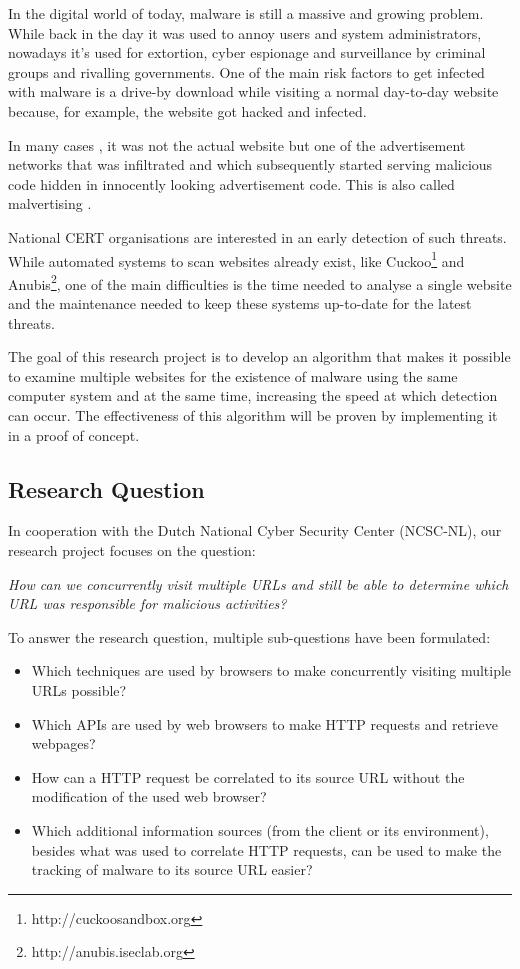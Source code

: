 In the digital world of today, malware is still a massive and growing problem. While back in the day it was used to annoy users and system administrators, nowadays it's used for extortion, cyber espionage and surveillance by criminal groups and rivalling governments. One of the main risk factors to get infected with malware is a drive-by download while visiting a normal day-to-day website because, for example, the website got hacked and infected. 

In many cases \cite{proofpoint,foxittelegraaf,foxityahoo}, it was not the actual website but one of the advertisement networks that was infiltrated and which subsequently started serving malicious code hidden in innocently looking advertisement code. This is also called malvertising \cite{Li2012}.

National CERT organisations are interested in an early detection of such threats. While automated systems to scan websites already exist, like Cuckoo\footnote{http://cuckoosandbox.org} and Anubis\footnote{http://anubis.iseclab.org}, one of the main difficulties is the time needed to analyse a single website and the maintenance needed to keep these systems up-to-date for the latest threats.

The goal of this research project is to develop an algorithm that makes it possible to examine multiple websites for the existence of malware using the same computer system and at the same time, increasing the speed at which detection can occur. The effectiveness of this algorithm will be proven by implementing it in a proof of concept.

\subsection{Research Question}

In cooperation with the Dutch National Cyber Security Center (NCSC-NL), our research project focuses on the question:

\textit{How can we concurrently visit multiple URLs and still be able to determine which URL was responsible for malicious activities?}

To answer the research question, multiple sub-questions have been formulated:

\begin{itemize}
\item Which techniques are used by browsers to make concurrently visiting multiple URLs possible?
\item Which APIs are used by web browsers to make HTTP requests and retrieve webpages?
\item How can a HTTP request be correlated to its source URL without the modification of the used web browser?
\item Which additional information sources (from the client or its environment), besides what was used to correlate HTTP requests, can be used to make the tracking of malware to its source URL easier?
\end{itemize}

